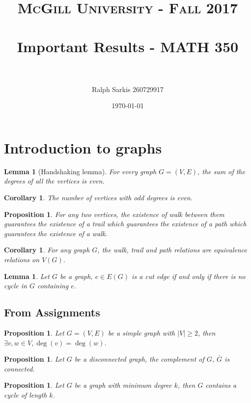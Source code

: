 \documentclass[paper=a4, fontsize=12pt]{scrartcl} %
\title{	
\normalfont \normalsize 
\textsc{McGill University - Fall 2017} \\ [0pt] %
\horrule{0.5pt} \\[0.4cm] %
\huge Important Results - MATH 350 \\ %
\horrule{2pt} \\[0cm] %
}
\author{Ralph Sarkis 260729917} %
\date{\normalsize\today} %
\newtheorem{cor}[thm]{Corollary}
\newtheorem{prop}[thm]{Proposition}
\newtheorem{lem}[thm]{Lemma}
\theoremstyle{definition}
\theoremstyle{remark}
\numberwithin{equation}{section} %
\numberwithin{figure}{section} %
\numberwithin{table}{section} %
\begin{document}
\maketitle %
\section{Introduction to graphs}
\begin{lem}[Handshaking lemma]
	For every graph $G = (V,E)$, the sum of the degrees of all the vertices is even.
\end{lem}
\begin{cor}
	The number of vertices with odd degrees is even.
\end{cor}
\begin{prop}
	For any two vertices, the existence of walk between them guarantees the existence of a trail which guarantees the existence of a path which guarantees the existence of a walk.
\end{prop}
\begin{cor}
	For any graph $G$, the walk, trail and path relations are equivalence relations on $V(G)$.
\end{cor}
\begin{lem}
	Let $G$ be a graph, $e \in E(G)$ is a cut edge if and only if there is no cycle in $G$ containing $e$.
\end{lem}
\subsection{From Assignments}
\begin{prop}
	Let $G = (V,E)$ be a simple graph with $|V| \geq 2$, then $\exists v,w \in V, \deg(v) = \deg(w)$.
\end{prop}
\begin{prop}
	Let $G$ be a disconnected graph, the complement of $G$, $\overline{G}$ is connected.
\end{prop}
\begin{prop}
	Let $G$ be a graph with minimum degree $k$, then $G$ contains a cycle of length $k$.
\end{prop}
\end{document}
